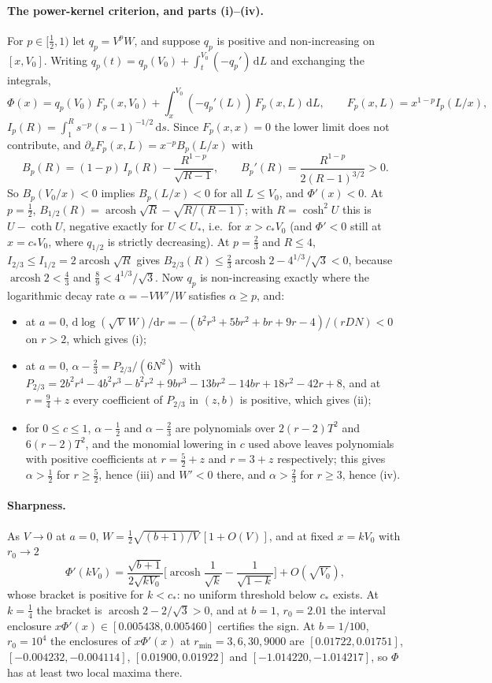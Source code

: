 \documentclass[12pt]{iopart}
\theoremstyle{plain}
\theoremstyle{definition}
\theoremstyle{remark}
\newcommand{\dd}{\mathrm{d}}
\begin{document}
\paragraph{The power-kernel criterion, and parts (i)--(iv).} For $p\in[\tfrac12,1)$ let
$q_p=V^pW$, and suppose $q_p$ is positive and non-increasing on $[x,V_0]$. Writing
$q_p(t)=q_p(V_0)+\int_t^{V_0}(-q_p')\,\dd L$ and exchanging the integrals,
\[
    \Phi(x)=q_p(V_0)\,F_p(x,V_0)+\int_x^{V_0}(-q_p'(L))\,F_p(x,L)\,\dd L,\qquad
    F_p(x,L)=x^{1-p}I_p(L/x),
\]
$I_p(R)=\int_1^Rs^{-p}(s-1)^{-1/2}\,\dd s$. Since $F_p(x,x)=0$ the lower limit does not
contribute, and $\partial_xF_p(x,L)=x^{-p}B_p(L/x)$ with
\[
    B_p(R)=(1-p)\,I_p(R)-\frac{R^{1-p}}{\sqrt{R-1}},\qquad
    B_p'(R)=\frac{R^{1-p}}{2(R-1)^{3/2}}>0 .
\]
So $B_p(V_0/x)<0$ implies $B_p(L/x)<0$ for all $L\le V_0$, and $\Phi'(x)<0$. At $p=\tfrac12$,
$B_{1/2}(R)=\operatorname{arcosh}\sqrt R-\sqrt{R/(R-1)}$; with $R=\cosh^2U$ this is
$U-\coth U$, negative exactly for $U<U_\ast$, i.e.\ for $x>c_\ast V_0$ (and $\Phi'<0$ still at
$x=c_\ast V_0$, where $q_{1/2}$ is strictly decreasing). At $p=\tfrac23$ and $R\le4$,
$I_{2/3}\le I_{1/2}=2\operatorname{arcosh}\sqrt R$ gives
$B_{2/3}(R)\le\tfrac23\operatorname{arcosh}2-4^{1/3}/\sqrt3<0$, because
$\operatorname{arcosh}2<\tfrac43$ and $\tfrac89<4^{1/3}/\sqrt3$. Now $q_p$ is non-increasing
exactly where the logarithmic decay rate $\alpha=-VW'/W$ satisfies $\alpha\ge p$, and:
\begin{itemize}
\item at $a=0$, $\dd\log(\sqrt V\,W)/\dd r=-(b^2r^3+5br^2+br+9r-4)/(rDN)<0$ on $r>2$, which
gives (i);
\item at $a=0$, $\alpha-\tfrac23=P_{2/3}/(6N^2)$ with
$P_{2/3}=2b^2r^4-4b^2r^3-b^2r^2+9br^3-13br^2-14br+18r^2-42r+8$, and at $r=\tfrac94+z$ every
coefficient of $P_{2/3}$ in $(z,b)$ is positive, which gives (ii);
\item for $0\le c\le1$, $\alpha-\tfrac12$ and $\alpha-\tfrac23$ are polynomials over
$2(r-2)T^2$ and $6(r-2)T^2$, and the monomial lowering in $c$ used above leaves
polynomials with positive coefficients at $r=\tfrac52+z$ and $r=3+z$ respectively; this
gives $\alpha>\tfrac12$ for $r\ge\tfrac52$, hence (iii) and $W'<0$ there, and
$\alpha>\tfrac23$ for $r\ge3$, hence (iv).
\end{itemize}

\paragraph{Sharpness.} As $V\to0$ at $a=0$, $W=\tfrac12\sqrt{(b+1)/V}\,[1+O(V)]$, and at
fixed $x=kV_0$ with $r_0\to2$
\[
    \Phi'(kV_0)=\frac{\sqrt{b+1}}{2\sqrt{kV_0}}\Big[\operatorname{arcosh}\frac1{\sqrt k}
    -\frac1{\sqrt{1-k}}\Big]+O(\sqrt{V_0}),
\]
whose bracket is positive for $k<c_\ast$: no uniform threshold below $c_\ast$ exists. At
$k=\tfrac14$ the bracket is $\operatorname{arcosh}2-2/\sqrt3>0$, and at $b=1$,
$r_0=2.01$ the interval enclosure $x\Phi'(x)\in[0.005438,0.005460]$ certifies the sign.
At $b=1/100$, $r_0=10^4$ the enclosures of $x\Phi'(x)$ at $r_{\min}=3,6,30,9000$ are
$[0.01722,0.01751]$, $[-0.004232,-0.004114]$, $[0.01900,0.01922]$ and
$[-1.014220,-1.014217]$, so $\Phi$ has at least two local maxima there.
\end{document}
